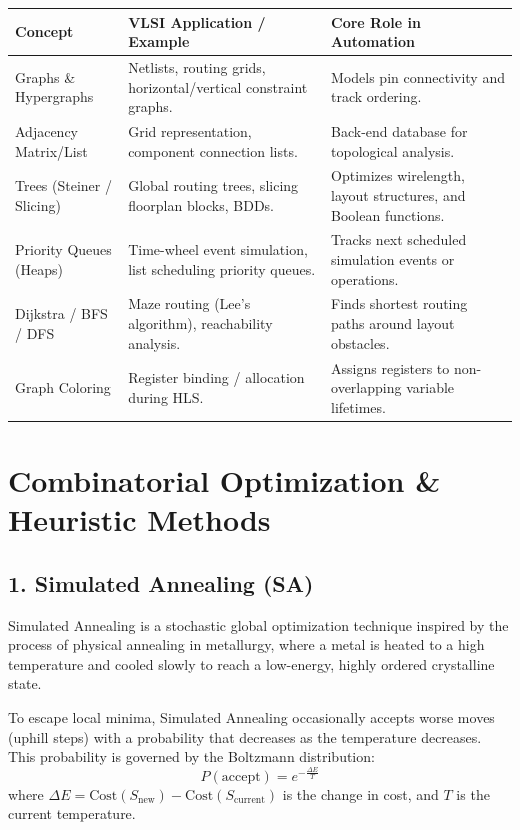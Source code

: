 \documentclass[12pt,a4paper]{article}
\renewcommand{\arraystretch}{1.45}
\begin{document}
\par\vspace{6pt}\noindent
{\renewcommand{\arraystretch}{1.35}%
\begin{tabularx}{\linewidth}{|B{3.2cm}|Y|Y|}
\hline
\textbf{Concept} & \textbf{VLSI Application / Example} & \textbf{Core Role in Automation} \\
\hline
Graphs \& Hypergraphs & Netlists, routing grids, horizontal/vertical constraint graphs. & Models pin connectivity and track ordering. \\
\hline
Adjacency Matrix/List & Grid representation, component connection lists. & Back-end database for topological analysis. \\
\hline
Trees (Steiner / Slicing) & Global routing trees, slicing floorplan blocks, BDDs. & Optimizes wirelength, layout structures, and Boolean functions. \\
\hline
Priority Queues (Heaps) & Time-wheel event simulation, list scheduling priority queues. & Tracks next scheduled simulation events or operations. \\
\hline
Dijkstra / BFS / DFS & Maze routing (Lee's algorithm), reachability analysis. & Finds shortest routing paths around layout obstacles. \\
\hline
Graph Coloring & Register binding / allocation during HLS. & Assigns registers to non-overlapping variable lifetimes. \\
\hline
\end{tabularx}}

\section{Combinatorial Optimization \& Heuristic Methods}

\subsection{1. Simulated Annealing (SA)}
Simulated Annealing is a stochastic global optimization technique inspired by the process of physical annealing in metallurgy, where a metal is heated to a high temperature and cooled slowly to reach a low-energy, highly ordered crystalline state.

\begin{tcolorbox}[defbox, title={Simulated Annealing Core Principle}]
  To escape local minima, Simulated Annealing occasionally accepts worse moves (uphill steps) with a probability that decreases as the temperature decreases. This probability is governed by the Boltzmann distribution:
  \begin{equation}
    P(\text{accept}) = e^{-\frac{\Delta E}{T}}
  \end{equation}
  where $\Delta E = \text{Cost}(S_{\text{new}}) - \text{Cost}(S_{\text{current}})$ is the change in cost, and $T$ is the current temperature.
\end{tcolorbox}
\end{document}
